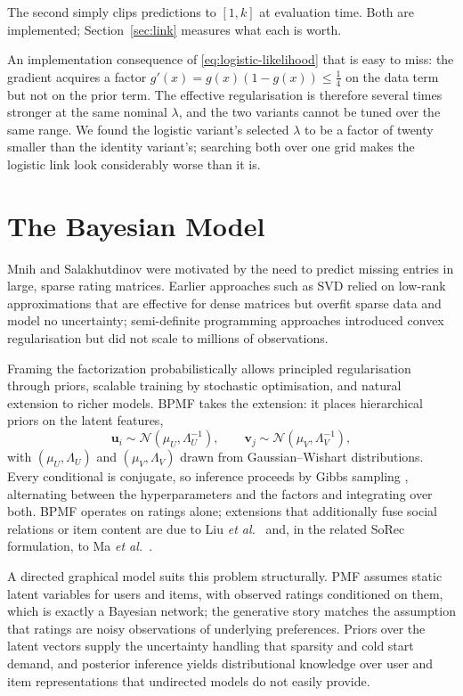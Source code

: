 \documentclass[conference]{IEEEtran}
\begin{document}
The second simply clips predictions to $[1,k]$ at evaluation time. Both are implemented;
Section~\ref{sec:link} measures what each is worth.

An implementation consequence of \eqref{eq:logistic-likelihood} that is easy to miss: the
gradient acquires a factor $g'(x) = g(x)(1-g(x)) \le \tfrac{1}{4}$ on the data term but not
on the prior term. The effective regularisation is therefore several times stronger at the
same nominal $\lambda$, and the two variants cannot be tuned over the same range. We
found the logistic variant's selected $\lambda$ to be a factor of twenty smaller than the
identity variant's; searching both over one grid makes the logistic link look considerably
worse than it is.

\section{The Bayesian Model}

Mnih and Salakhutdinov \cite{mnih2007probabilistic} were motivated by the need to predict
missing entries in large, sparse rating matrices. Earlier approaches such as SVD relied on
low-rank approximations that are effective for dense matrices but overfit sparse data and
model no uncertainty; semi-definite programming approaches introduced convex regularisation
but did not scale to millions of observations.

Framing the factorization probabilistically allows principled regularisation through
priors, scalable training by stochastic optimisation, and natural extension to richer
models. BPMF \cite{salakhutdinov2008bayesian} takes the extension: it places hierarchical
priors on the latent features,
\[\mathbf{u}_i \sim \mathcal{N}\!\left(\mu_U, \Lambda_U^{-1}\right), \qquad
  \mathbf{v}_j \sim \mathcal{N}\!\left(\mu_V, \Lambda_V^{-1}\right),\]
with $(\mu_U,\Lambda_U)$ and $(\mu_V,\Lambda_V)$ drawn from Gaussian--Wishart
distributions. Every conditional is conjugate, so inference proceeds by Gibbs sampling
\cite{gelfand1990sampling}, alternating between the hyperparameters and the factors and
integrating over both. BPMF operates on ratings alone; extensions that additionally fuse
social relations or item content are due to Liu \emph{et al.}\ \cite{liu2013bayesian} and,
in the related SoRec formulation, to Ma \emph{et al.}\ \cite{ma2008sorec}.

A directed graphical model suits this problem structurally. PMF assumes static latent
variables for users and items, with observed ratings conditioned on them, which is exactly
a Bayesian network; the generative story matches the assumption that ratings are noisy
observations of underlying preferences. Priors over the latent vectors supply the
uncertainty handling that sparsity and cold start demand, and posterior inference yields
distributional knowledge over user and item representations that undirected models do not
easily provide.
\end{document}

